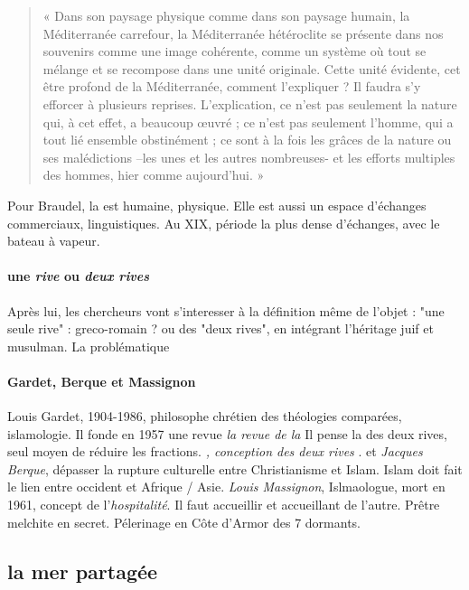 \begin{quote}
    « Dans son paysage physique comme dans son paysage humain, la Méditerranée carrefour, la Méditerranée hétéroclite se présente dans nos souvenirs comme une image cohérente, comme un système où tout se mélange et se recompose dans une unité originale. Cette unité évidente, cet être profond de la Méditerranée, comment l’expliquer ? Il faudra s’y efforcer à plusieurs reprises. L’explication, ce n’est pas seulement la nature qui, à cet effet, a beaucoup œuvré ; ce n’est pas seulement l’homme, qui a tout lié ensemble obstinément ; ce sont à la fois les grâces de la nature ou ses malédictions –les unes et les autres nombreuses- et les efforts multiples des hommes, hier comme aujourd’hui. »
\end{quote}

Pour Braudel, la \Med est humaine, physique. Elle est aussi un espace d'échanges commerciaux, linguistiques. Au XIX, période la plus dense d'échanges, avec le bateau à vapeur. 


\paragraph{une \textit{rive} ou \textit{deux rives}}Après lui, les chercheurs vont s'interesser à la définition même de l'objet : "une seule rive" : greco-romain ? ou des "deux rives", en intégrant l'héritage juif et musulman. La problématique 

\paragraph{Gardet, Berque et Massignon}{Louis Gardet, 1904-1986, philosophe chrétien des théologies comparées, islamologie. Il fonde en 1957 une revue \textit{la revue de la \Med}Il pense la \Med des deux rives, seul moyen de réduire les fractions. \textit{\Med, conception des deux rives } }. et \textit{Jacques Berque}, dépasser la rupture culturelle entre Christianisme et Islam. Islam doit fait le lien entre occident et Afrique / Asie. \textit{Louis Massignon}, Islmaologue, mort en 1961, concept de l'\textit{hospitalité}. Il faut accueillir et accueillant de l'autre. Prêtre melchite en secret. Pélerinage en Côte d'Armor des 7 dormants.


\subsection{la mer partagée}

